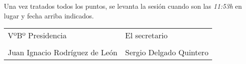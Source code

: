 \documentclass[a4paper, 12pt]{article}
\begin{document}
Una vez tratados todos los puntos, se levanta la sesión cuando son las \textit{11:53h} en lugar y fecha arriba indicados.

\vspace{1cm}

\begin{table}[h]
    \begin{tabular}{p{9cm}p{9cm}}
        VºBº Presidencia & El secretario \\
        \vspace{3cm} & \vspace{3cm} \\
        Juan Ignacio Rodríguez de León & Sergio Delgado Quintero \\
    \end{tabular}
\end{table}
\end{document}
